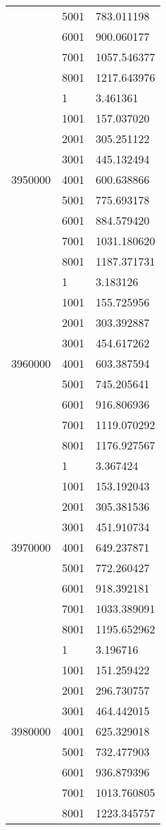 \begin{table}[htb!]
\begin{tabular}{lll}
 & 5001 & 783.011198 \\
 & 6001 & 900.060177 \\
 & 7001 & 1057.546377 \\
 & 8001 & 1217.643976 \\
\multirow[c]{9}{*}{3950000} & 1 & 3.461361 \\
 & 1001 & 157.037020 \\
 & 2001 & 305.251122 \\
 & 3001 & 445.132494 \\
 & 4001 & 600.638866 \\
 & 5001 & 775.693178 \\
 & 6001 & 884.579420 \\
 & 7001 & 1031.180620 \\
 & 8001 & 1187.371731 \\
\multirow[c]{9}{*}{3960000} & 1 & 3.183126 \\
 & 1001 & 155.725956 \\
 & 2001 & 303.392887 \\
 & 3001 & 454.617262 \\
 & 4001 & 603.387594 \\
 & 5001 & 745.205641 \\
 & 6001 & 916.806936 \\
 & 7001 & 1119.070292 \\
 & 8001 & 1176.927567 \\
\multirow[c]{9}{*}{3970000} & 1 & 3.367424 \\
 & 1001 & 153.192043 \\
 & 2001 & 305.381536 \\
 & 3001 & 451.910734 \\
 & 4001 & 649.237871 \\
 & 5001 & 772.260427 \\
 & 6001 & 918.392181 \\
 & 7001 & 1033.389091 \\
 & 8001 & 1195.652962 \\
\multirow[c]{9}{*}{3980000} & 1 & 3.196716 \\
 & 1001 & 151.259422 \\
 & 2001 & 296.730757 \\
 & 3001 & 464.442015 \\
 & 4001 & 625.329018 \\
 & 5001 & 732.477903 \\
 & 6001 & 936.879396 \\
 & 7001 & 1013.760805 \\
 & 8001 & 1223.345757 \\

\end{tabular}
\end{table}
